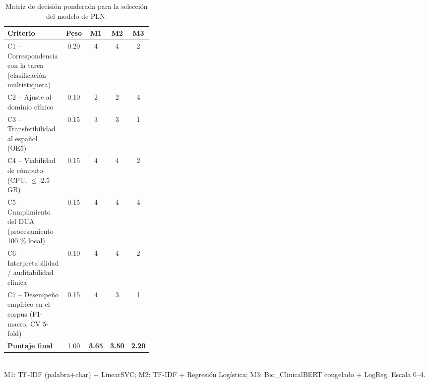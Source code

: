 \begin{table}[htbp]
\centering
\caption{Matriz de decisi\'on ponderada para la selecci\'on del modelo de PLN.}
\label{tab:seleccion-modelos}
\begin{tabular}{@{}p{0.34\linewidth}cccc@{}}
\toprule
Criterio & Peso & M1 & M2 & M3 \\
\midrule
C1 -- Correspondencia con la tarea (clasificación multietiqueta) & 0.20 & 4 & 4 & 2 \\
C2 -- Ajuste al dominio clínico & 0.10 & 2 & 2 & 4 \\
C3 -- Transferibilidad al español (OE5) & 0.15 & 3 & 3 & 1 \\
C4 -- Viabilidad de cómputo (CPU, $\leq$ 2.5 GB) & 0.15 & 4 & 4 & 2 \\
C5 -- Cumplimiento del DUA (procesamiento 100 \% local) & 0.15 & 4 & 4 & 4 \\
C6 -- Interpretabilidad / auditabilidad clínica & 0.10 & 4 & 4 & 2 \\
C7 -- Desempeño empírico en el corpus (F1-macro, CV 5-fold) & 0.15 & 4 & 3 & 1 \\
\midrule
\textbf{Puntaje final} & 1.00 & \textbf{3.65} & \textbf{3.50} & \textbf{2.20} \\
\bottomrule
\end{tabular}
\\[2pt]
\footnotesize
M1: TF-IDF (palabra+char) + LinearSVC; M2: TF-IDF + Regresión Logística; M3: Bio_ClinicalBERT congelado + LogReg. Escala 0--4.
\end{table}
